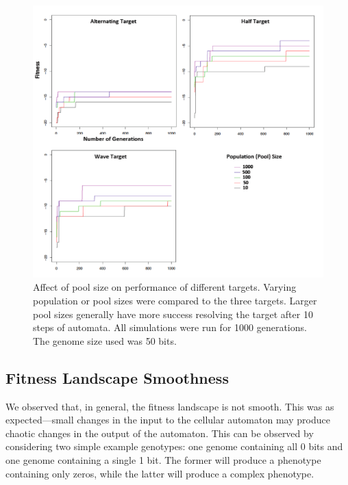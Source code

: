 \documentclass[twocolumn]{article}
\begin{document}
\begin{figure}
	\includegraphics[width=\textwidth]{figures/sim/figure_3small.pdf}
	\caption{Affect of pool size on performance of different targets.  Varying population or pool sizes were compared to the three targets.  Larger pool sizes generally have more success resolving the target after 10 steps of automata.  All simulations were run for 1000 generations.  The genome size used was 50 bits.
  }
	\label{fig:sim3}
\end{figure}



\subsection{Fitness Landscape Smoothness}

We observed that, in general, the fitness landscape is not smooth. This was as expected---small changes in the input to the cellular automaton may produce chaotic changes in the output of the automaton. This can be observed by considering two simple example genotypes: one genome containing all 0 bits and one genome containing a single 1 bit. The former will produce a phenotype containing only zeros, while the latter will produce a complex phenotype.
\end{document}
